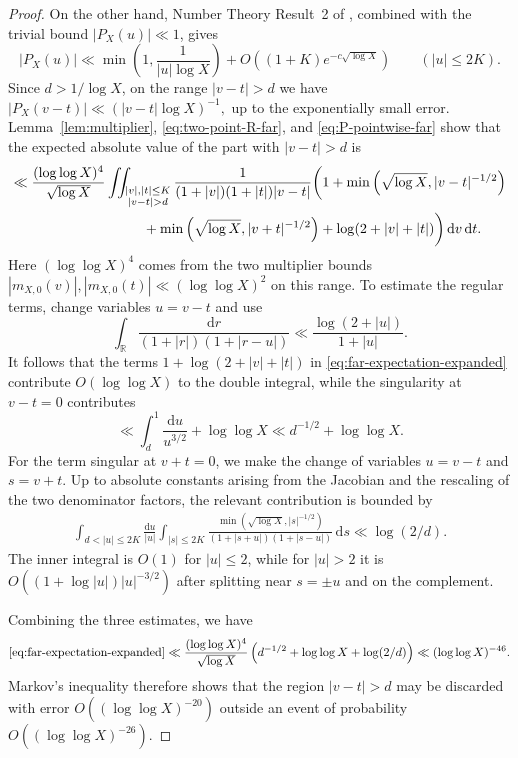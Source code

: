 \documentclass[a4paper,12pt,reqno]{amsart}
\numberwithin{equation}{section}
\theoremstyle{remark}
\begin{document}
\begin{proof}
On the other hand, Number Theory Result~2 of
\cite[Section~2.2]{Harper2023Large}, combined with the trivial bound
$|P_X(u)|\ll1$, gives
\begin{equation}\label{eq:P-pointwise-far}
 |P_X(u)|\ll
 \min\left(1,\frac1{|u|\log X}\right)
 +O\left((1+K)e^{-c\sqrt{\log X}}\right)
 \qquad (|u|\leq2K).
\end{equation}
Since $d>1/\log X$, on the range $|v-t|>d$ we have
\(
 |P_X(v-t)|\ll ({|v-t|\log X})^{-1},
\)
up to the exponentially small error.
Lemma~\ref{lem:multiplier}, \eqref{eq:two-point-R-far}, and
\eqref{eq:P-pointwise-far} show that the expected absolute value of the
part with $|v-t|>d$ is
\begin{align}
 \ll \frac{(\log\log X)^4}{\sqrt{\log X}}
 &\iint_{\substack{|v|,|t|\leq K\\ |v-t|>d}}
 \frac{1}{(1+|v|)(1+|t|)|v-t|}
 \bigg(
 1+\min\left(\sqrt{\log X},|v-t|^{-1/2}\right)\notag\\
 &\qquad\ \ +\min\left(\sqrt{\log X},|v+t|^{-1/2}\right)
 +\log(2+|v|+|t|)\bigg)
 \,\mathrm{d}v\,\mathrm{d}t .
 \label{eq:far-expectation-expanded}
\end{align}
Here $(\log\log X)^4$ comes from the two multiplier bounds
$|m_{X,0}(v)|,|m_{X,0}(t)|\ll(\log\log X)^2$ on this range.
To estimate the regular terms, change variables $u=v-t$ and use
\[
 \int_{\mathbb R}
 \frac{\mathrm{d}r}{(1+|r|)(1+|r-u|)}
 \ll\frac{\log(2+|u|)}{1+|u|}.
\]
It follows that the terms
$1+\log(2+|v|+|t|)$ in
\eqref{eq:far-expectation-expanded} contribute $O(\log\log X)$ to the double integral, while
the singularity at $v-t=0$ contributes
\begin{equation}\label{eq:difference-singularity}
 \ll \int_d^1\frac{\mathrm{d}u}{u^{3/2}}+\log\log X
 \ll d^{-1/2}+\log\log X.
\end{equation}
For the term singular at $v+t=0$, we make the change
of variables \( u=v-t \) and \(s=v+t.
\)
Up to absolute constants arising from the Jacobian and the rescaling of
the two denominator factors, the relevant contribution is bounded by
\begin{align}
 \int_{d<|u|\leq2K}\frac{\mathrm{d}u}{|u|}
 \int_{|s|\leq2K}
 \frac{\min\left(\sqrt{\log X},|s|^{-1/2}\right)}
 {(1+|s+u|)(1+|s-u|)}\,\mathrm{d}s
 \ll\log(2/d).
 \label{eq:rad-sum-kernel}
\end{align}
The inner integral is $O(1)$ for $|u|\leq2$, while for
$|u|>2$ it is
$O((1+\log|u|)|u|^{-3/2})$ after splitting near $s=\pm u$ and on the
complement. 

Combining the three estimates, we have
\[
\eqref{eq:far-expectation-expanded} \ll
 \frac{(\log\log X)^4}{\sqrt{\log X}}
 \left(d^{-1/2}+\log\log X+\log(2/d)\right)
 \ll(\log\log X)^{-46}.
\]
Markov's inequality
therefore shows that the region $|v-t|>d$ may be discarded with error
$O((\log\log X)^{-20})$ outside an event of probability
$O((\log\log X)^{-26})$.


\end{proof}
\end{document}
